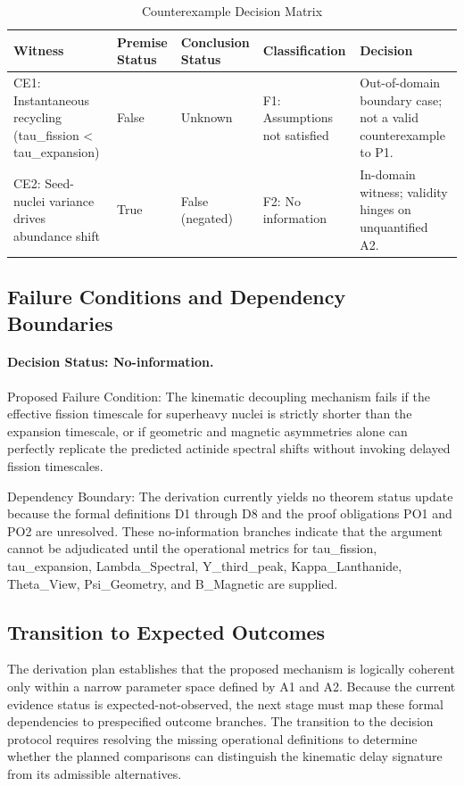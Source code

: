 \documentclass[conference]{IEEEtran}
\begin{document}
\begin{table}[htbp]
\centering
\footnotesize
\setlength{\tabcolsep}{3pt}
\renewcommand{\arraystretch}{1.12}
\caption{Counterexample Decision Matrix}
\label{tab:forward-derivation-and-counterexamples-fd-sec-05}
\begin{tabular}{|p{}|p{}|p{}|p{}|p{}|}
\hline
Witness & Premise Status & Conclusion Status & Classification & Decision \\\hline
CE1: Instantaneous recycling (tau\_fission < tau\_expansion) & False & Unknown & F1: Assumptions not satisfied & Out-of-domain boundary case; not a valid counterexample to P1. \\\hline
CE2: Seed-nuclei variance drives abundance shift & True & False (negated) & F2: No information & In-domain witness; validity hinges on unquantified A2. \\\hline
\end{tabular}
\end{table}

\subsection{Failure Conditions and Dependency Boundaries}
\paragraph{Decision Status: No-information.} Proposed Failure Condition: The kinematic decoupling mechanism fails if the effective fission timescale for superheavy nuclei is strictly shorter than the expansion timescale, or if geometric and magnetic asymmetries alone can perfectly replicate the predicted actinide spectral shifts without invoking delayed fission timescales.

Dependency Boundary: The derivation currently yields no theorem status update because the formal definitions D1 through D8 and the proof obligations PO1 and PO2 are unresolved. These no-information branches indicate that the argument cannot be adjudicated until the operational metrics for tau\_fission, tau\_expansion, Lambda\_Spectral, Y\_third\_peak, Kappa\_Lanthanide, Theta\_View, Psi\_Geometry, and B\_Magnetic are supplied.~\cite{cite_403b23aaa35e6b92,cite_8beeacaea00bd823}

\subsection{Transition to Expected Outcomes}
The derivation plan establishes that the proposed mechanism is logically coherent only within a narrow parameter space defined by A1 and A2. Because the current evidence status is expected-not-observed, the next stage must map these formal dependencies to prespecified outcome branches. The transition to the decision protocol requires resolving the missing operational definitions to determine whether the planned comparisons can distinguish the kinematic delay signature from its admissible alternatives.
\end{document}
